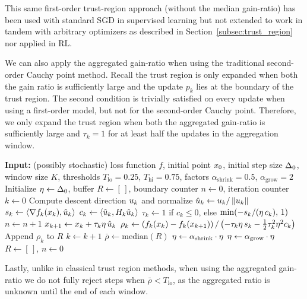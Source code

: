 This same first-order trust-region approach (without the median gain-ratio) has been used with standard SGD in supervised learning  but not extended to work in tandem with arbitrary optimizers as described in Section~\ref{subsec:trust_region} nor applied in RL. 

We can also apply the aggregated gain-ratio when using the traditional second-order Cauchy point method. Recall the trust region is only expanded when both the gain ratio is sufficiently large and the update $p_k$ lies at the boundary of the trust region. The second condition is trivially satisfied on every update when using a first-order model, but not for the second-order Cauchy point. Therefore, we only expand the trust region when both the aggregated gain-ratio is sufficiently large and $\tau_k=1$ for at least half the updates in the aggregation window.

\begin{algorithm}[H]
\caption{Cauchy Point with Median Gain Ratio}
\label{alg:cauchy-point-tr}
\begin{algorithmic}[1]
\State \textbf{Input:} (possibly stochastic) loss function $f$, initial point $x_{0}$, initial step size $\Delta_0$, window size $K$, thresholds $T_{\text{lo}} = 0.25$, $T_{\text{hi}} = 0.75$, factors $\alpha_{\text{shrink}} = 0.5$, $\alpha_{\text{grow}} = 2$
\State Initialize $\eta \gets \Delta_0$, buffer $R \gets [\,]$, boundary counter $n \gets 0$, iteration counter $k \gets 0$
    \State Compute descent direction $u_{k}$ and normalize $\hat{u}_k \gets u_{k} / \left \lVert u_{k} \right \rVert$
    \State $s_k \gets \langle \nabla f_k(x_{k}), \hat{u}_k \rangle$ 
    \State $c_k \gets \langle \hat{u}_k, H_k \hat{u}_k \rangle$ 
    \State $\tau_k \gets 1$ if $c_k \le 0$, else $\min(-s_k / (\eta \, c_k),\, 1)$ 
        \State $n \gets n + 1$ 
    \EndIf
    \State $x_{k+1} \gets x_{k} + \tau_k \eta \, \hat{u}_k$
    \State $\rho_k \gets \left(f_k(x_{k}) - f_k(x_{k+1})\right) / \left(-\tau_k \eta \, s_k - \tfrac{1}{2} \tau_k^2 \eta^2 c_k\right)$
    \State Append $\rho_k$ to $R$
    \State $k \gets k + 1$
        \State $\bar{\rho} \gets \text{median}(R)$
            \State $\eta \gets \alpha_{\text{shrink}} \cdot \eta$
            \State $\eta \gets \alpha_{\text{grow}} \cdot \eta$
        \EndIf
        \State $R \gets [\,]$, $n \gets 0$
    \EndIf
\EndFor
\end{algorithmic}
\end{algorithm}
Lastly, unlike in classical trust region methods, when using the aggregated gain-ratio we do not fully reject steps when $\bar{\rho} < T_{\text{lo}}$, as the aggregated ratio is unknown until the end of each window.


